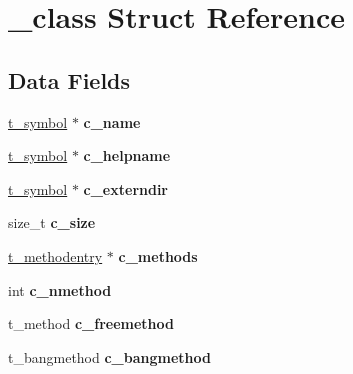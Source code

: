 \hypertarget{struct__class}{\section{\-\_\-class Struct Reference}
\label{struct__class}
}
\subsection*{Data Fields}
\begin{DoxyCompactItemize}
\item 
\hypertarget{struct__class_a6b1d595c3eed41231261cc949de6c059}{\hyperlink{struct__symbol}{t\-\_\-symbol} $\ast$ {\bfseries c\-\_\-name}}\label{struct__class_a6b1d595c3eed41231261cc949de6c059}

\item 
\hypertarget{struct__class_a949669dda1e00625aff771e3e274bb31}{\hyperlink{struct__symbol}{t\-\_\-symbol} $\ast$ {\bfseries c\-\_\-helpname}}\label{struct__class_a949669dda1e00625aff771e3e274bb31}

\item 
\hypertarget{struct__class_a8e12371c4164ec953b22950df825dea9}{\hyperlink{struct__symbol}{t\-\_\-symbol} $\ast$ {\bfseries c\-\_\-externdir}}\label{struct__class_a8e12371c4164ec953b22950df825dea9}

\item 
\hypertarget{struct__class_a0198d73ee8756b65cc24e9db5c5d36bc}{size\-\_\-t {\bfseries c\-\_\-size}}\label{struct__class_a0198d73ee8756b65cc24e9db5c5d36bc}

\item 
\hypertarget{struct__class_a63380cff39023325e5539eb543fada14}{\hyperlink{struct__methodentry}{t\-\_\-methodentry} $\ast$ {\bfseries c\-\_\-methods}}\label{struct__class_a63380cff39023325e5539eb543fada14}

\item 
\hypertarget{struct__class_ac0e851d9de3998d3cfb3c16f0867aa64}{int {\bfseries c\-\_\-nmethod}}\label{struct__class_ac0e851d9de3998d3cfb3c16f0867aa64}

\item 
\hypertarget{struct__class_aa1efaf80b289de63f09891bb3e2aab5f}{t\-\_\-method {\bfseries c\-\_\-freemethod}}\label{struct__class_aa1efaf80b289de63f09891bb3e2aab5f}

\item 
\hypertarget{struct__class_ab19bf88295c6bf4483fb7b0b7ae6d096}{t\-\_\-bangmethod {\bfseries c\-\_\-bangmethod}}\label{struct__class_ab19bf88295c6bf4483fb7b0b7ae6d096}


\end{DoxyCompactItemize}

